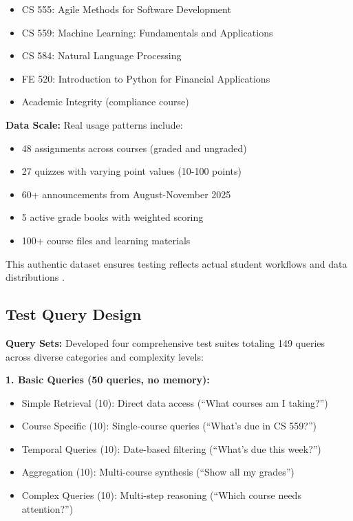 \documentclass{article}
\begin{document}
\begin{itemize}
    \item CS 555: Agile Methods for Software Development
    \item CS 559: Machine Learning: Fundamentals and Applications  
    \item CS 584: Natural Language Processing
    \item FE 520: Introduction to Python for Financial Applications
    \item Academic Integrity (compliance course)
\end{itemize}

\textbf{Data Scale:} Real usage patterns include:
\begin{itemize}
    \item 48 assignments across courses (graded and ungraded)
    \item 27 quizzes with varying point values (10-100 points)
    \item 60+ announcements from August-November 2025
    \item 5 active grade books with weighted scoring
    \item 100+ course files and learning materials
\end{itemize}

This authentic dataset ensures testing reflects actual student workflows and data distributions \cite{lms2025ai}.

\subsection{Test Query Design}

\textbf{Query Sets:} Developed four comprehensive test suites totaling 149 queries across diverse categories and complexity levels:

\textbf{1. Basic Queries (50 queries, no memory):}
\begin{itemize}
    \item Simple Retrieval (10): Direct data access (``What courses am I taking?'')
    \item Course Specific (10): Single-course queries (``What's due in CS 559?'')
    \item Temporal Queries (10): Date-based filtering (``What's due this week?'')
    \item Aggregation (10): Multi-course synthesis (``Show all my grades'')
    \item Complex Queries (10): Multi-step reasoning (``Which course needs attention?'')
\end{itemize}
\end{document}
